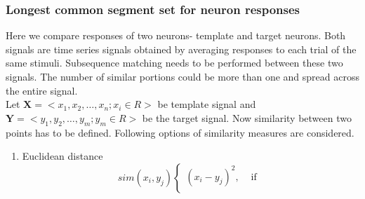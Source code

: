 \documentclass[11pt,paper=a4,answers]{exam}
\begin{document}
\subsubsection{Longest common segment set for neuron responses} %
\label{ssub:longest_common_segment_set_for_neuron_responses}
Here we compare responses of two neurons- template and target neurons. Both signals are time series signals obtained by averaging responses to each trial of the same stimuli. Subsequence matching needs to be performed
between these two signals. The number of similar portions could be more than one and spread across the entire signal.\\
Let $\bm{X} = < x_1, x_2,\hdots, x_n ; x_i \in R >$ be template signal and $\bm{Y} = <y_1, y_2, \hdots, y_m ; y_m \in R>$ be the target signal. Now similarity between two points has to be defined. Following options of similarity measures are considered.
\begin{enumerate}
    \item Euclidean distance\\
    $$sim(x_i, y_j)  \begin{cases}
        (x_i - y_j)^2, &\text{ if } \\
        
    \end{cases}$$
\end{enumerate}
\end{document}

